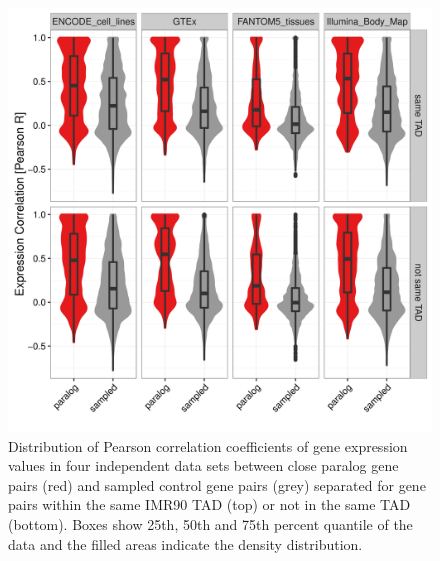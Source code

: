 \documentclass[a4paper,twoside=true,openright,parskip=full,chapterprefix=true,11pt,headings=normal,bibliography=totoc,listof=totoc,titlepage=on,captions=tableabove,draft=false]{scrreprt}
\theoremstyle{definition}
\theoremstyle{definition}
\theoremstyle{definition}
\theoremstyle{remark}
\begin{document}
\begin{figure}

{\centering \includegraphics[width=0.8\linewidth]{figures/paralog/SI/figS10} 

}

\caption{Distribution of Pearson correlation coefficients of gene
expression values in four independent data sets between close paralog
gene pairs (red) and sampled control gene pairs (grey) separated for
gene pairs within the same IMR90 TAD (top) or not in the same TAD
(bottom). Boxes show 25th, 50th and 75th percent quantile of the data
and the filled areas indicate the density distribution.}\label{fig:ExpByTAD}
\end{figure}
\end{document}
